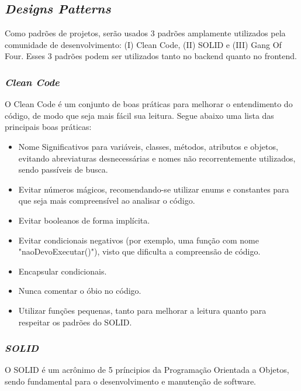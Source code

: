 \subsection{\emph{Designs Patterns}}

Como padrões de projetos, serão usados 3 padrões amplamente utilizados pela comunidade de desenvolvimento: (I) Clean Code, (II) SOLID e (III) Gang Of Four. Esses 3 padrões podem ser utilizados tanto no backend quanto no frontend.

\subsubsection{\emph{Clean Code}}

O Clean Code é um conjunto de boas práticas para melhorar o entendimento do código, de modo que seja mais fácil sua leitura. Segue abaixo uma lista das principais boas práticas:

\begin{itemize}
	\item Nome Significativos para variáveis, classes, métodos, atributos e objetos, evitando abreviaturas desnecessárias e nomes não recorrentemente utilizados, sendo passíveis de busca.
	\item Evitar números mágicos, recomendando-se utilizar enums e constantes para que seja mais compreensível ao analisar o código.
	\item Evitar booleanos de forma implícita.
	\item Evitar condicionais negativos (por exemplo, uma função com nome "naoDevoExecutar()"), visto que dificulta a compreensão de código.
	\item Encapsular condicionais.
	\item Nunca comentar o óbio no código.
	\item Utilizar funções pequenas, tanto para melhorar a leitura quanto para respeitar os padrões do SOLID.
\end{itemize}

\subsubsection{\emph{SOLID}}

O SOLID é um acrônimo de 5 príncipios da Programação Orientada a Objetos, sendo fundamental para o desenvolvimento e manutenção de software.

